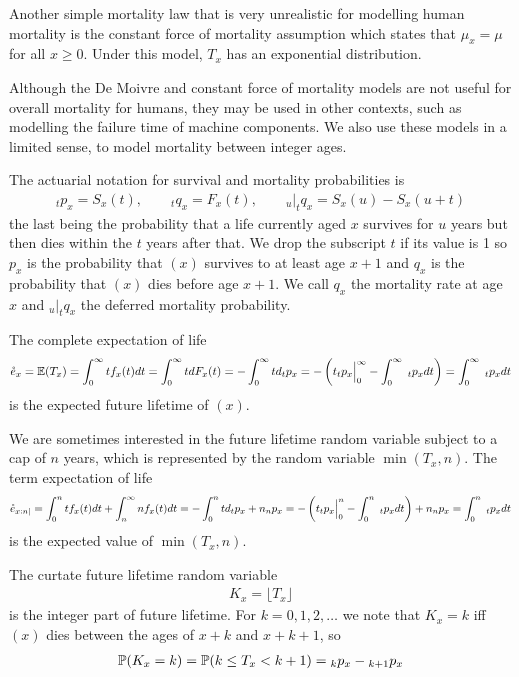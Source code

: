 \documentclass[hidelinks, 12pt]{article}
\theoremstyle{mydefstyle}
\theoremstyle{mythmstyle}
\begin{document}
Another simple mortality law that is very unrealistic for modelling human mortality is the constant force of mortality assumption which states that $\mu_x = \mu$ for all $x \ge 0$. Under this model, $T_x$ has an exponential distribution. 

Although the De Moivre and constant force of mortality models are not useful for overall mortality for humans, they may be used in other contexts, such as modelling the failure time of machine components. We also use these models in a limited sense, to model mortality between integer ages. 

The actuarial notation for survival and mortality probabilities is
\begin{gather*}
_tp_x = S_x(t), \qquad _tq_x = F_x(t), \qquad _u\vert_tq_x = S_x(u) - S_x(u+t)
\end{gather*}
the last being the probability that a life currently aged $x$ survives for $u$ years but then dies within the $t$ years after that. We drop the subscript $t$ if its value is 1 so $p_x$ is the probability that $(x)$ survives to at least age $x+1$ and $q_x$ is the probability that $(x)$ dies before age $x+1$. We call $q_x$ the mortality rate at age $x$ and $_u\vert_tq_x$ the deferred mortality probability. 

The complete expectation of life
\begin{gather*}
\mathring{e}_x = \mathbb{E}(T_x) = \int_0^{\infty} t f_x(t) dt = \int_0^{\infty} t dF_x(t)
= - \int_0^{\infty} t d_tp_x = -\left( t_tp_x \Big\vert_0^{\infty} - \int_0^{\infty} \hspace{1mm}_tp_x dt \right)
= \int_0^{\infty} \hspace{1mm}_tp_x dt
\end{gather*}
is the expected future lifetime of $(x)$.

We are sometimes interested in the future lifetime random variable subject to a cap of $n$ years, which is represented by the random variable $\min(T_x, n)$. The term expectation of life
\begin{gather*}
\mathring{e}_{x:n|}
= \int_0^n tf_x(t) dt + \int_n^{\infty} n f_x(t)dt
= -\int_0^n t d_tp_x + n_np_x
= -\left( t_tp_x \Big\vert_0^n - \int_0^n \hspace{1mm}_tp_x dt \right) + n_np_x
= \int_0^n \hspace{1mm}_tp_x dt
\end{gather*}
is the expected value of $\min(T_x, n)$.

The curtate future lifetime random variable
\begin{gather*}
K_x = \lfloor T_x \rfloor
\end{gather*}
is the integer part of future lifetime. For $k = 0, 1, 2, \dots$ we note that $K_x = k$ iff $(x)$ dies between the ages of $x+k$ and $x+k+1$, so
\begin{gather*}
\mathbb{P}(K_x = k)
= \mathbb{P}(k \le T_x < k+1)
=  \hspace{0mm}_kp_x - \hspace{0mm}_{k+1}p_x
\end{gather*}
\end{document}
